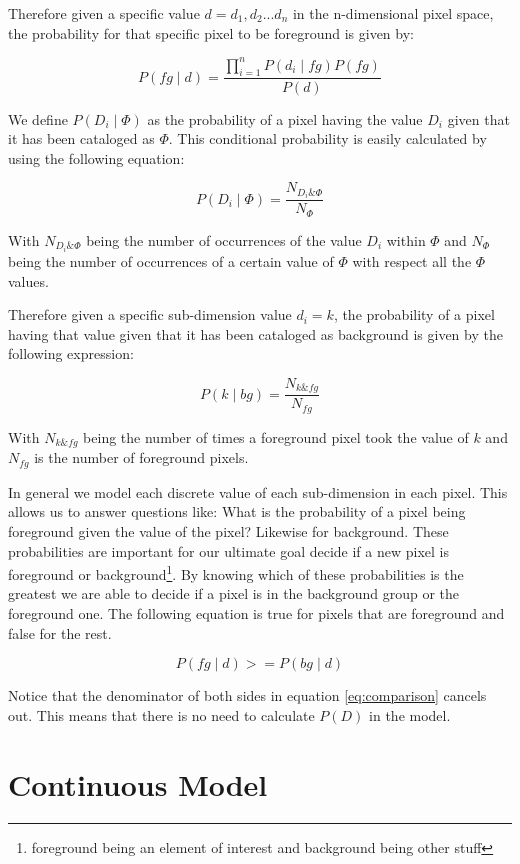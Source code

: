\documentclass[a4paper,12pt]{report}
\begin{document}
Therefore given a specific value $d={d_1,d_2...d_n}$ in the n-dimensional
pixel space, the probability for that specific pixel to be foreground is
given by:

\begin{equation}
P(fg \mid d) = \frac{\prod_{i=1}^n{P(d_i \mid fg)} P(fg)}{P(d)}
\end{equation}

We define $P(D_i \mid \Phi)$ as the probability of a pixel having the value $D_i$
given that it has been cataloged as $\Phi$. This conditional probability is
easily calculated by using the following equation:

\begin{equation}
P(D_i \mid \Phi) = \frac{N_{D_i\&\Phi}}{N_{\Phi}}
\end{equation}

With $N_{D_i\&\Phi}$ being the number of occurrences of the value $D_i$ within
$\Phi$ and $N_{\Phi}$ being the number of occurrences of a certain value of
$\Phi$ with respect all the $\Phi$ values.

Therefore given a specific sub-dimension value $d_i=k$, the probability of a
pixel having that value given that it has been cataloged as background is given
by the following expression:

\begin{equation}
P(k \mid bg) = \frac{N_{k\&fg}}{N_{fg}}
\end{equation}

With $N_{k\&fg}$ being the number of times a foreground pixel took the value of
$k$ and $N_{fg}$ is the number of foreground pixels.

In general we model each discrete value of each sub-dimension in
each pixel. This allows us to answer questions like: What is the probability of
a pixel being foreground given the value of the pixel? Likewise for background.
These probabilities are important for our ultimate goal decide if a new pixel
is foreground or background\footnote{foreground being an element of interest
and background being other stuff}. By knowing which of these probabilities is
the greatest we are able to decide if a pixel is in the background group or the
foreground one. The following equation is true for pixels that are foreground
and false for the rest.

\begin{equation}\label{eq:comparison}
P(fg \mid d) >= P(bg \mid d)
\end{equation}

Notice that the denominator of both sides in equation \ref{eq:comparison}
cancels out. This means that there is no need to calculate $P(D)$ in the model.

\section{Continuous Model}

\listoffixmes
\end{document}
